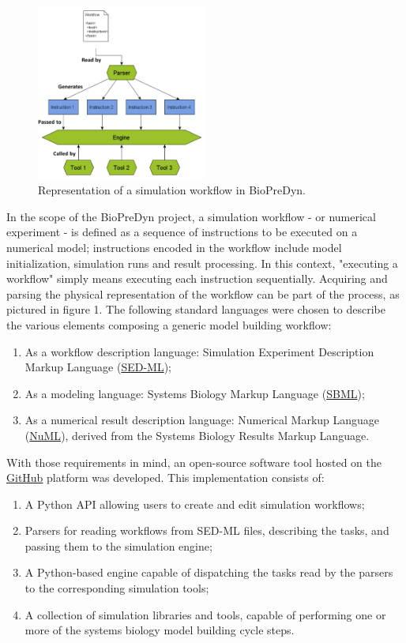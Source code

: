 \documentclass{llncs}
\begin{document}
\begin{figure}[!hbtp]
  \centering
  \includegraphics[width=0.5\textwidth]{proposal_complete.pdf}
  \caption{Representation of a simulation workflow in BioPreDyn.}
\end{figure}
In the scope of the BioPreDyn project, a simulation workflow - or
numerical experiment - is defined as a sequence of instructions to be executed
on a numerical model; instructions encoded in the workflow include model
initialization, simulation runs and result processing. In this context,
"executing a workflow" simply means executing each instruction sequentially.
Acquiring and parsing the physical representation of the workflow can be part
of the process, as pictured in figure 1. The following standard languages were
chosen to describe the various elements composing a generic model building
workflow:
\begin{enumerate}
\item As a workflow description language: Simulation Experiment Description
Markup Language (\href{http://sed-ml.org/}{SED-ML});
\item As a modeling language: Systems Biology Markup Language
(\href{http://sbml.org}{SBML});
\item As a numerical result description language: Numerical Markup Language
(\href{http://code.google.com/p/numl/}{NuML}), derived from the Systems Biology
Results Markup Language.
\end{enumerate}
With those requirements in mind, an open-source software tool hosted on the
\href{http://www.github.com/bmoreau/biopredyn}{GitHub} platform was developed.
This implementation consists of:
\begin{enumerate}
\item A Python API allowing users to create and edit simulation workflows;
\item Parsers for reading workflows from SED-ML files, describing the tasks,
and passing them to the simulation engine;
\item A Python-based engine capable of dispatching the tasks read by the parsers
to the corresponding simulation tools;
\item A collection of simulation libraries and tools, capable of performing one
or more of the systems biology model building cycle steps.
\end{enumerate}
\end{document}
